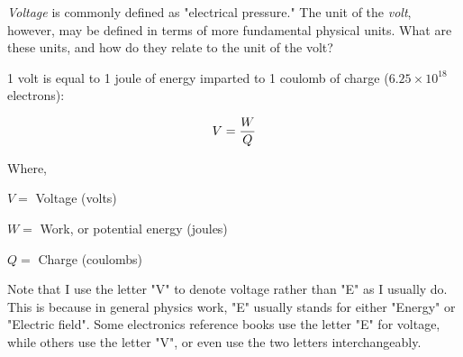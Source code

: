 

{\it Voltage} is commonly defined as "electrical pressure."  The unit of the {\it volt}, however, may be defined in terms of more fundamental physical units.  What are these units, and how do they relate to the unit of the volt?







1 volt is equal to 1 joule of energy imparted to 1 coulomb of charge ($6.25 \times 10^{18}$ electrons):

$$V = {W \over Q}$$

\noindent
Where,

$V =$ Voltage (volts)

$W =$ Work, or potential energy (joules)

$Q =$ Charge (coulombs) 







Note that I use the letter "V" to denote voltage rather than "E" as I usually do.  This is because in general physics work, "E" usually stands for either "Energy" or "Electric field".  Some electronics reference books use the letter "E" for voltage, while others use the letter "V", or even use the two letters interchangeably.




